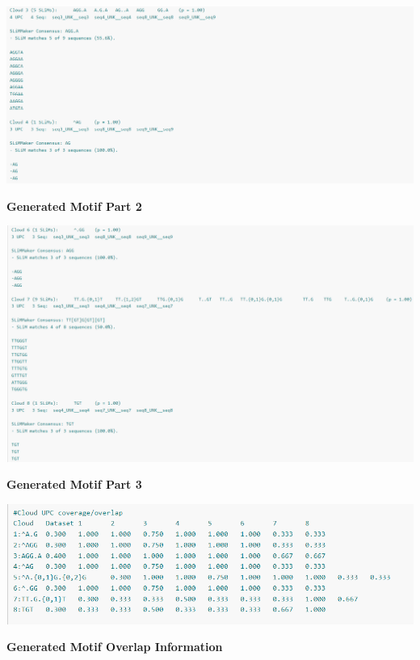 \vspace{8pt}
\begin{center}
\includegraphics[width=14cm]{images/cloud2.png}
\end{center}
\begin{center}
\textbf{Generated Motif Part 2}
\end{center}
\vspace{8pt}

\vspace{8pt}
\begin{center}
\includegraphics[width=14cm]{images/cloud3.png}
\end{center}
\begin{center}
\textbf{Generated Motif Part 3}
\end{center}
\vspace{8pt}

\vspace{8pt}
\begin{center}
\includegraphics[width=14cm]{images/cloudOverlap.png}
\end{center}
\begin{center}
\textbf{Generated Motif Overlap Information}
\end{center}
\vspace{8pt}

